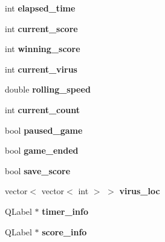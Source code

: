 \begin{DoxyCompactItemize}
\item 
\mbox{\label{classGame1Grid_af9bd5c08a0511489472cef0904bbe076}} 
int {\bfseries elapsed\+\_\+time}
\item 
\mbox{\label{classGame1Grid_af2031f545abc4c2453ae2c8e68cac2a4}} 
int {\bfseries current\+\_\+score}
\item 
\mbox{\label{classGame1Grid_adcd49fbafcb94b2a8d22c2aacc9dbee9}} 
int {\bfseries winning\+\_\+score}
\item 
\mbox{\label{classGame1Grid_a076381d9a4906c991d02f8cbf3e794ce}} 
int {\bfseries current\+\_\+virus}
\item 
\mbox{\label{classGame1Grid_a080f9f38136ab7a8ffb8919bb6586f25}} 
double {\bfseries rolling\+\_\+speed}
\item 
\mbox{\label{classGame1Grid_a6894b7fbdfdb34d4ca17c919bc11ed8c}} 
int {\bfseries current\+\_\+count}
\item 
\mbox{\label{classGame1Grid_a1fd5852433bb39f4d92a825be2bff9c8}} 
bool {\bfseries paused\+\_\+game}
\item 
\mbox{\label{classGame1Grid_a3bb5c92a6f79f809f2967a40d102589b}} 
bool {\bfseries game\+\_\+ended}
\item 
\mbox{\label{classGame1Grid_ac7b283dc13d9d826e39da1cccf8fc56f}} 
bool {\bfseries save\+\_\+score}
\item 
\mbox{\label{classGame1Grid_a0d63233ec6ad42e0b176a85a23707e47}} 
vector$<$ vector$<$ int $>$ $>$ {\bfseries virus\+\_\+loc}
\item 
\mbox{\label{classGame1Grid_aec374b3c5f5b37a6f9a23078058b8b3e}} 
Q\+Label $\ast$ {\bfseries timer\+\_\+info}
\item 
\mbox{\label{classGame1Grid_a10a3952539821cfc4e0db86a2f86ccd6}} 
Q\+Label $\ast$ {\bfseries score\+\_\+info}

\end{DoxyCompactItemize}
